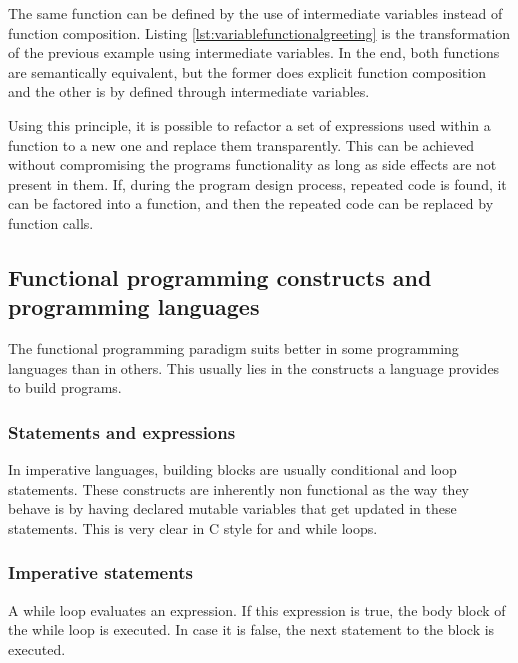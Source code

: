 \documentclass[../main.tex]{subfiles}
\begin{document}


The same function can be defined by the use of intermediate variables instead of
function composition. Listing \ref{lst:variablefunctionalgreeting} is the
transformation of the previous example using intermediate variables. In the end,
both functions are semantically equivalent, but the former does explicit
function composition and the other is by defined through intermediate variables.



Using this principle, it is possible to refactor a set of expressions used within
a function to a new one and replace them transparently. This can be achieved
without compromising the programs functionality as long as side effects are not
present in them. If, during the program design process, repeated code is found,
it can be factored into a function, and then the repeated code can be replaced by
function calls.

\subsection{Functional programming constructs and programming languages} The
functional programming paradigm suits better in some programming languages than
in others. This usually lies in the constructs a language provides to build
programs.

\subsubsection{Statements and expressions} In imperative languages, building
blocks are usually conditional and loop statements. These constructs are
inherently non functional as the way they behave is by having declared mutable variables
that get updated in these statements. This is very clear in C style for and
while loops.

\subsubsection{Imperative statements} A while loop evaluates an expression. If
this expression is true, the body block of the while loop is executed. In case it is
false, the next statement to the block is executed.
\end{document}
